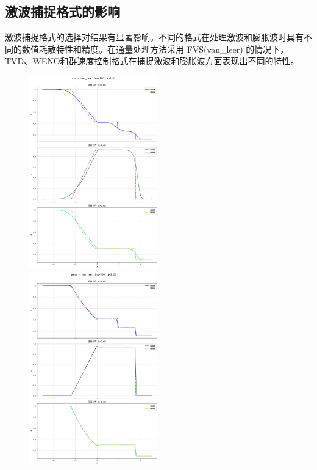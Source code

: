 \documentclass[UTF8]{ctexart}
\begin{document}
\subsection{激波捕捉格式的影响}
激波捕捉格式的选择对结果有显著影响。不同的格式在处理激波和膨胀波时具有不同的数值耗散特性和精度。在通量处理方法采用 FVS(van\_leer) 的情况下，TVD、WENO和群速度控制格式在捕捉激波和膨胀波方面表现出不同的特性。
\begin{figure}
    \includegraphics[width=0.5\textwidth]{tvd.png}
    \includegraphics[width=0.5\textwidth]{weno.png}\\

\end{figure}
\end{document}
